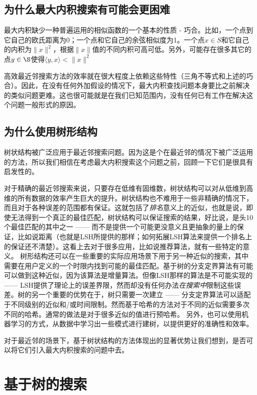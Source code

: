 \documentclass[twocolumn,a4paper]{article}
\begin{document}
\subsection{为什么最大内积搜索有可能会更困难}

最大内积缺少一种普遍运用的相似函数的一个基本的性质 - 巧合。比如，一个点到它自己的欧氏距离为0；一个点和它自己的余弦相似度为1。一个点$x \in S$和它自己的内积为$\|x\|^2$，根据$\|x\|$值的不同内积可高可低。另外，可能存在很多其它的点$y \in \S$使得$\langle y,x \rangle < \|x\|^2$

高效最近邻搜索方法的效率就在很大程度上依赖这些特性（三角不等式和上述的巧合）。因此，在没有任何外加假设的情况下，最大内积查找问题本身要比之前解决的类似问题更难。这也很可能就是在我们已知范围内，没有任何已有工作在解决这个问题一般形式的原因。

\subsection{为什么使用树形结构}

树状结构被广泛应用于最近邻搜索问题\cite{13,4,29,8,32}。因为这是个在最近邻的情况下被广泛运用的方法，所以我们相信在考虑最大内积搜索这个问题之前，回顾一下它们是很具有启发性的。

对于精确的最近邻搜索来说，只要存在低维有固维数\cite{4,10}，树状结构可以对从低维到高维的所有数据的效率产生巨大的提升。树状结构也不难用于一些非精确的情况下，而且对于各种误差的范围都有保证。这就包括了\emph{排名}意义上的近似，也就是说，即使无法得到一个真正的最佳匹配，树状结构可以保证搜索的结果，好比说，是头10个最佳匹配的其中之一\cite{32} —— 而不是提供一个可能更没意义且更抽象的量上的保证，比如说距离（也就是LSH所提供的那样；如何拓展LSH算法来提供一个排名上的保证还不清楚）。这看上去对于很多应用，比如说推荐算法，就有一些特定的意义。
树形结构还可以在一些重要的实际应用场景下用于另一种近似的搜索，其中需要在用户定义的一个时限内找到可能的最佳匹配。基于树的分支定界算法有可能可以做到这种近似，因为该算法是增量算法。但像LSH那样的算法是不可能实现的 —— LSH提供了理论上的误差界限，然而却没有任何办法\emph{在搜索中}限制这些误差。树的另一个重要的优势在于，树只需要一次建立 —— 分支定界算法可以适配于不同级别的近似和/或时间限制。然而基于哈希的方法对于不同的近似需要多次不同的哈希。通常的做法是对于很多近似的值进行预哈希。
另外，也可以使用机器学习的方式，从数据中学习出一些模式进行建树\cite{6,25}，以提供更好的准确性和效率。

对于最近邻的场景下，基于树状结构的方法体现出的显著优势让我们想到，是否可以将它们引入最大内积搜索的问题中去。

\section{基于树的搜索}
\end{document}

